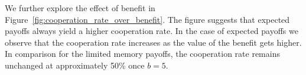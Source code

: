 \documentclass[11pt]{article}
\theoremstyle{plainCl1}
\theoremstyle{plainCl2}
\begin{document}
We further explore the effect of benefit in
Figure~\ref{fig:cooperation_rate_over_benefit}. The figure suggests that
expected payoffs always yield a higher cooperation rate. In the case of expected
payoffs we observe that the cooperation rate increases as the value of the
benefit gets higher. In comparison for the limited memory payoffs, the
cooperation rate remains unchanged at approximately 50\% once \(b=5\).


\end{document}
